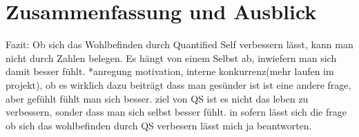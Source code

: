 
\chapter{Zusammenfassung und Ausblick}
\label{ch:Zusammenfassung}

Fazit:
Ob sich das Wohlbefinden durch Quantified Self verbessern lässt, kann man nicht durch Zahlen belegen. Es hängt von einem Selbst ab, inwiefern man sich damit besser fühlt.
*anregung motivation, interne konkurrenz(mehr laufen im projekt), ob es wirklich dazu beiträgt dass man gesünder ist ist eine andere frage, aber gefühlt fühlt man sich besser.
ziel von QS ist es nicht das leben zu verbessern, sonder dass man sich selbst besser fühlt. in sofern lässt sich die frage ob sich das wohlbefinden durch QS verbesern lässt mich ja beantworten.

